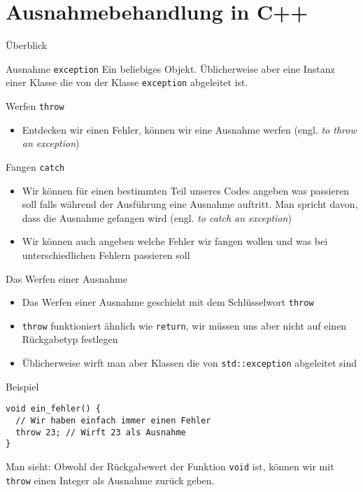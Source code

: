 \documentclass[presentation]{beamer}
\begin{document}
\section{Ausnahmebehandlung in C++}
\label{sec:org7ccb0ee}
\begin{frame}[label={sec:orgf62bddb},fragile]{Überblick}
 \begin{block}{Ausnahme {\color{solarizedYellow}\texttt{exception}}}
Ein beliebiges Objekt. Üblicherweise aber eine \alert{Instanz einer Klasse}
die von der Klasse {\color{solarizedYellow}\verb!exception!} abgeleitet ist.
\end{block}
\begin{block}{Werfen {\color{solarizedYellow}\texttt{throw}}}
\begin{itemize}
\item Entdecken wir einen Fehler, können wir eine \alert{Ausnahme werfen} (engl.
\emph{to throw an exception})
\end{itemize}
\end{block}
\begin{block}{Fangen {\color{solarizedYellow}\texttt{catch}}}
\begin{itemize}
\item Wir können für einen bestimmten Teil unseres Codes angeben was
passieren soll falls während der Ausführung eine Ausnahme auftritt.
Man spricht davon, dass die \alert{Ausnahme gefangen} wird (engl. \emph{to
catch an exception})
\item Wir können auch angeben \alert{welche Fehler} wir fangen wollen und was bei
unterschiedlichen Fehlern passieren soll
\end{itemize}
\end{block}
\end{frame}
\begin{frame}[label={sec:org095e288},fragile]{Das Werfen einer Ausnahme}
 \begin{itemize}
\item Das Werfen einer Ausnahme geschieht mit dem Schlüsselwort {\color{solarizedYellow}\verb!throw!}
\item {\color{solarizedYellow}\verb!throw!} funktioniert ähnlich wie {\color{solarizedYellow}\verb!return!}, wir müssen uns aber nicht
auf einen Rückgabetyp festlegen
\item Üblicherweise wirft man aber Klassen die von {\color{solarizedYellow}\verb!std::exception!}
abgeleitet sind
\end{itemize}
\begin{block}{Beispiel}
\begin{verbatim}
void ein_fehler() {
  // Wir haben einfach immer einen Fehler
  throw 23; // Wirft 23 als Ausnahme
}
\end{verbatim}
Man sieht: Obwohl der Rückgabewert der Funktion {\color{solarizedYellow}\verb!void!} ist, können wir
mit {\color{solarizedYellow}\verb!throw!} einen Integer als Ausnahme zurück geben.
\end{block}
\end{frame}
\end{document}
